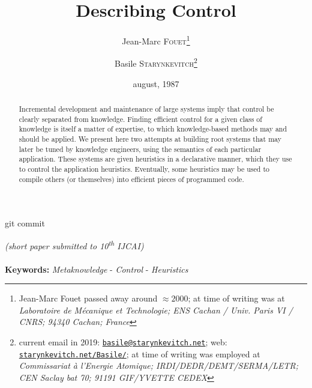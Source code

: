 \documentclass[11pt,a4paper,svgnames]{article}
\begin{document}


\date{august, 1987}

\title{Describing Control}

\author{Jean-Marc \textsc{Fouet}\thanks{Jean-Marc Fouet passed away
    around $\approx 2000$; at time of writing was at \emph{Laboratoire de
      Mécanique et Technologie; ENS Cachan / Univ. Paris VI / CNRS;
      94340 Cachan; France}}
\and
Basile \textsc{Starynkevitch}\thanks{current email in 2019:
    \href{mailto:basile@starynkevitch.net}{\texttt{basile@starynkevitch.net}};
    web:
    \href{http://starynkevitch.net/Basile/}{\texttt{starynkevitch.net/Basile/}};
    at time of writing was employed at \emph{Commissariat à l'Energie
      Atomique; IRDI/DEDR/DEMT/SERMA/LETR; CEN Saclay bat 70; 91191
      GIF/YVETTE CEDEX}}}

  \begin{titlepage}
    \maketitle

    \bigskip

    \begin{center}
      \begin{relsize}{-1.5}
        git commit \texttt{\gitcommit}
      \end{relsize}
    \end{center}
    
  \end{titlepage}

  \begin{center}
    \emph{(short paper submitted to 10\textsuperscript{th} IJCAI)}\\
      {}\\
    \textbf{Keywords:} \emph{Metaknowledge} - \emph{Control} - \emph{Heuristics}
  \end{center}

  \begin{abstract}
    Incremental development and maintenance of large systems imply that control
    be clearly separated from knowledge. Finding efficient control for a given
    class of knowledge is itself a matter of expertise, to which knowledge-based
    methods may and should be applied. We present here two attempts at building
    root systems that may later be tuned by knowledge engineers, using the
    semantics of each particular application. These systems are given heuristics
    in a declarative manner, which they use to control the application heuristics.
    Eventually, some heuristics may be used to compile others (or themselves) into
    efficient pieces of programmed code.
  \end{abstract}
\end{document}
